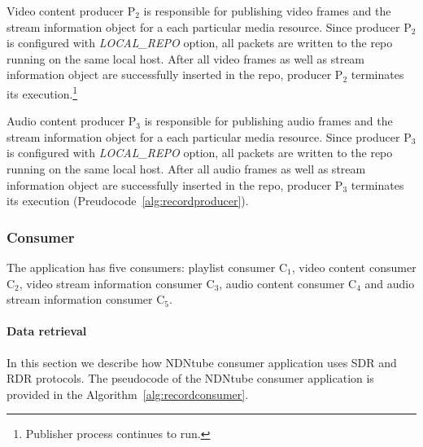 Video content producer P$_{\text{2}}$ is responsible for publishing video frames and the stream information object for a each particular media resource. Since producer P$_{\text{2}}$ is configured with \textit{LOCAL\_REPO} option, all packets are written to the repo running on the same local host. After all video frames as well as stream information object are successfully inserted in the repo, producer P$_{\text{2}}$ terminates its execution.\footnote{Publisher process continues to run.} 

Audio content producer P$_{\text{3}}$ is responsible for publishing audio frames and the stream information object for a each particular media resource. Since producer P$_{\text{3}}$ is configured with \textit{LOCAL\_REPO} option, all packets are written to the repo running on the same local host. After all audio frames as well as stream information object are successfully inserted in the repo, producer P$_{\text{3}}$ terminates its execution (Preudocode~\ref{alg:recordproducer}).

\subsubsection{Consumer}

The application has five consumers: playlist consumer C$_{\text{1}}$, video content consumer C$_{\text{2}}$, video stream information consumer C$_{\text{3}}$, audio content consumer C$_{\text{4}}$ and audio stream information consumer C$_{\text{5}}$. %


\paragraph{Data retrieval} %
\label{par:ndntube_data_retrieval}
\vspace{0.3cm}

In this section we describe how NDNtube consumer application uses SDR and RDR protocols. The pseudocode of the NDNtube consumer application is provided in the Algorithm~\ref{alg:recordconsumer}.

